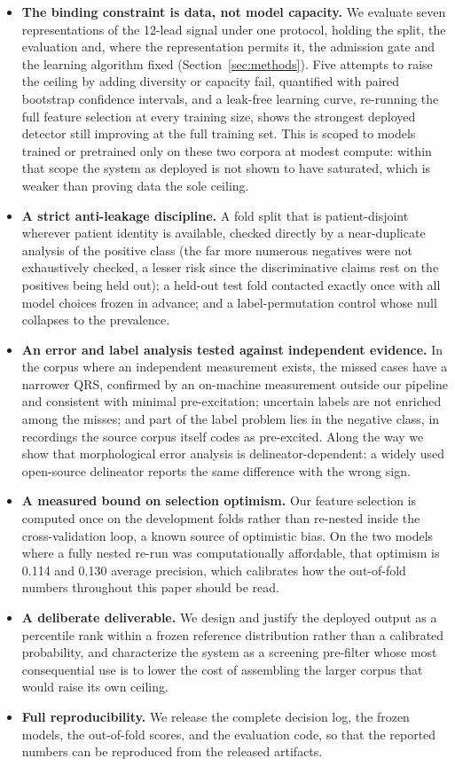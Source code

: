 \documentclass[11pt]{article}
\begin{document}
\begin{itemize}[leftmargin=1.4em,itemsep=2pt]
  \item \textbf{The binding constraint is data, not model capacity.} We evaluate seven representations of the 12-lead signal under one protocol, holding the split, the evaluation and, where the representation permits it, the admission gate and the learning algorithm fixed (Section~\ref{sec:methods}). Five attempts to raise the ceiling by adding diversity or capacity fail, quantified with paired bootstrap confidence intervals, and a leak-free learning curve, re-running the full feature selection at every training size, shows the strongest deployed detector still improving at the full training set. This is scoped to models trained or pretrained only on these two corpora at modest compute: within that scope the system as deployed is not shown to have saturated, which is weaker than proving data the sole ceiling.
  \item \textbf{A strict anti-leakage discipline.} A fold split that is patient-disjoint wherever patient identity is available, checked directly by a near-duplicate analysis of the positive class (the far more numerous negatives were not exhaustively checked, a lesser risk since the discriminative claims rest on the positives being held out); a held-out test fold contacted exactly once with all model choices frozen in advance; and a label-permutation control whose null collapses to the prevalence.
  \item \textbf{An error and label analysis tested against independent evidence.} In the corpus where an independent measurement exists, the missed cases have a narrower QRS, confirmed by an on-machine measurement outside our pipeline and consistent with minimal pre-excitation; uncertain labels are not enriched among the misses; and part of the label problem lies in the negative class, in recordings the source corpus itself codes as pre-excited. Along the way we show that morphological error analysis is delineator-dependent: a widely used open-source delineator reports the same difference with the wrong sign.
  \item \textbf{A measured bound on selection optimism.} Our feature selection is computed once on the development folds rather than re-nested inside the cross-validation loop, a known source of optimistic bias. On the two models where a fully nested re-run was computationally affordable, that optimism is 0.114 and 0.130 average precision, which calibrates how the out-of-fold numbers throughout this paper should be read.
  \item \textbf{A deliberate deliverable.} We design and justify the deployed output as a percentile rank within a frozen reference distribution rather than a calibrated probability, and characterize the system as a screening pre-filter whose most consequential use is to lower the cost of assembling the larger corpus that would raise its own ceiling.
  \item \textbf{Full reproducibility.} We release the complete decision log, the frozen models, the out-of-fold scores, and the evaluation code, so that the reported numbers can be reproduced from the released artifacts.
\end{itemize}
\end{document}
